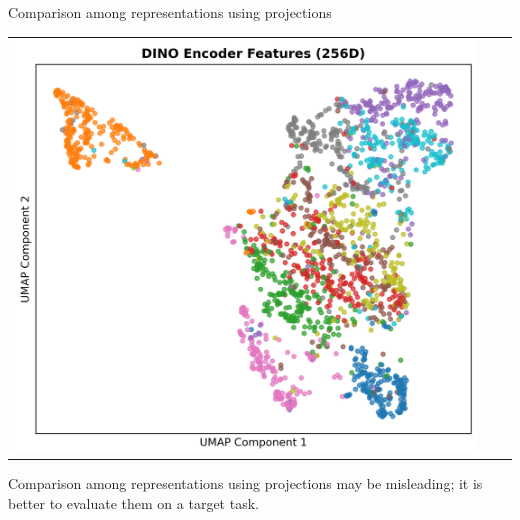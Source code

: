 \documentclass{beamer}
\begin{document}
\begin{frame}{Comparison among representations using projections}
\begin{center}
\begin{tabular}{ccc}
      \includegraphics[scale=0.2]{./figs/dino_umap_projection.png}
    \end{tabular}
  \end{center}
Comparison among representations using projections may be misleading;
it is better to evaluate them on a target task.
  
\end{frame}
\end{document}
